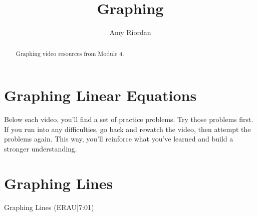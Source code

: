 \documentclass{ximera}
\title{Graphing}
\author{Amy Riordan}
\begin{document}
\begin{abstract}
Graphing video resources from Module 4.
\end{abstract}
\maketitle

\section*{Graphing Linear Equations}

Below each video, you’ll find a set of practice problems. Try those problems first. If you run into any difficulties, go back and rewatch the video, then attempt the problems again. This way, you’ll reinforce what you’ve learned and build a stronger understanding.

\section*{Graphing Lines}

Graphing Lines (ERAU|7:01)

\end{document}
